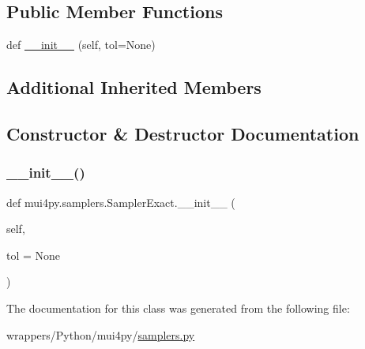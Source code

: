 \subsection*{Public Member Functions}
\begin{DoxyCompactItemize}
\item 
def \hyperlink{classmui4py_1_1samplers_1_1_sampler_exact_a20993f10e10b9b4b6603e39f494d4faa}{\+\_\+\+\_\+init\+\_\+\+\_\+} (self, tol=None)
\end{DoxyCompactItemize}
\subsection*{Additional Inherited Members}


\subsection{Constructor \& Destructor Documentation}
\mbox{\label{classmui4py_1_1samplers_1_1_sampler_exact_a20993f10e10b9b4b6603e39f494d4faa}} 
\subsubsection{\texorpdfstring{\+\_\+\+\_\+init\+\_\+\+\_\+()}{\_\_init\_\_()}}
{\footnotesize\ttfamily def mui4py.\+samplers.\+Sampler\+Exact.\+\_\+\+\_\+init\+\_\+\+\_\+ (\begin{DoxyParamCaption}\item[{}]{self,  }\item[{}]{tol = {\ttfamily None} }\end{DoxyParamCaption})}



The documentation for this class was generated from the following file\+:\begin{DoxyCompactItemize}
\item 
wrappers/\+Python/mui4py/\hyperlink{samplers_8py}{samplers.\+py}\end{DoxyCompactItemize}

